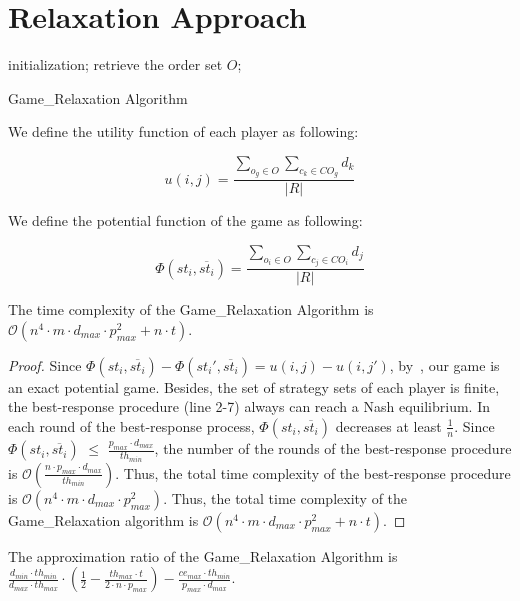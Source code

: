 \section{Relaxation Approach}

\begin{algorithm}[t]
	\DontPrintSemicolon
	{
		initialization;\;
		retrieve the order set $O$;\;
		\caption{Game\_Relaxation Algorithm}
		\label{algo:Game}
	}
\end{algorithm}

We define the utility function of each player as following:

\begin{equation*}
u(i,j) = \frac{\sum_{o_g \in O}\sum_{c_k \in CO_g} d_k}{|R|}
\end{equation*}

We define the potential function of the game as following:

\begin{equation*}
\Phi(st_i, \overline{st_i}) = \frac{\sum_{o_i \in O}\sum_{c_j \in CO_i} d_j}{|R|}
\end{equation*}

\begin{theorem}
	The time complexity of the Game\_Relaxation Algorithm is $\mathcal{O}(n^4 \cdot m \cdot d_{max} \cdot p_{max}^2 + n\cdot t)$.
\end{theorem}
\begin{proof}
	Since $\Phi(st_i, \overline{st_i}) - \Phi(st_{i}', \overline{st_i}) = u(i, j) - u(i, j')$, by~\cite{}, our game is an exact potential game. Besides, the set of strategy sets of each player is finite, the best-response procedure (line 2-7) always can reach a Nash equilibrium. In each round of the best-response process, $\Phi(st_i, \overline{st_i})$ decreases at least $\frac{1}{n}$. Since $\Phi(st_i, \overline{st_i})$ $\leq$ $\frac{p_{max} \cdot d_{max}}{th_{min}}$, the number of the rounds of the best-response procedure is $\mathcal{O}(\frac{n \cdot p_{max} \cdot d_{max}}{th_{min}})$. Thus, the total time complexity of the best-response procedure is $\mathcal{O}(n^4 \cdot m \cdot d_{max} \cdot p_{max}^2)$. Thus, the total time complexity of the Game\_Relaxation algorithm is $\mathcal{O}(n^4 \cdot m \cdot d_{max} \cdot p_{max}^2 + n\cdot t)$.
\end{proof}

\begin{theorem}
	The approximation ratio of the Game\_Relaxation Algorithm is $\frac{d_{min} \cdot th_{min}}{d_{max} \cdot th_{max}} \cdot (\frac{1}{2} - \frac{th_{max} \cdot t}{2 \cdot n \cdot p_{max}}) - \frac{ce_{max} \cdot th_{min}}{p_{max} \cdot d_{max}}$.
\end{theorem}
